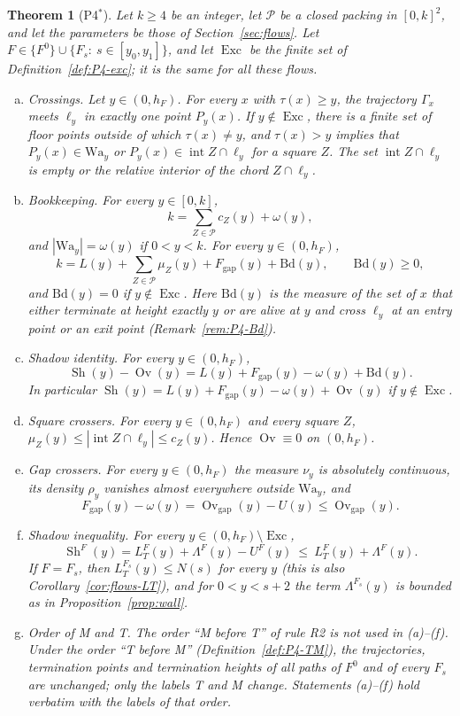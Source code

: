 \documentclass[11pt]{amsart}
\newcommand{\cP}{\mathcal P}
\newcommand{\Sh}{\operatorname{Sh}}
\newcommand{\Ov}{\operatorname{Ov}}
\newcommand{\Ovgap}{\operatorname{Ov}_{\mathrm{gap}}}
\newcommand{\Fgap}{F_{\mathrm{gap}}}
\newcommand{\Exc}{\operatorname{Exc}}
\newcommand{\Lam}{\Lambda}
\newcommand{\Fz}{F^{0}}
\newcommand{\Fs}{F_{s}}
\newtheorem{theorem}{Theorem}[section]
\theoremstyle{definition}
\theoremstyle{remark}
\numberwithin{equation}{section}
\begin{document}
\begin{theorem}[P4$^*$]\label{thm:P4}
Let $k\ge4$ be an integer, let $\cP$ be a closed packing in $[0,k]^2$, and let the parameters be those of Section~\ref{sec:flows}. Let $F\in\{\Fz\}\cup\{\Fs:\ s\in[y_0,y_1]\}$, and let $\Exc$ be the finite set of Definition~\ref{def:P4-exc}; it is the same for all these flows.
\begin{enumerate}[(a)]
\item \emph{Crossings.} Let $y\in(0,h_F)$. For every $x$ with $\tau(x)\ge y$, the trajectory $\Gamma_x$ meets $\ell_y$ in exactly one point $P_y(x)$. If $y\notin\Exc$, there is a finite set of floor points outside of which $\tau(x)\ne y$, and $\tau(x)>y$ implies that $P_y(x)\in\mathrm{Wa}_y$ or $P_y(x)\in\operatorname{int}Z\cap\ell_y$ for a square $Z$. The set $\operatorname{int}Z\cap\ell_y$ is empty or the relative interior of the chord $Z\cap\ell_y$.
\item \emph{Bookkeeping.} For every $y\in[0,k]$,
\[
k=\sum_{Z\in\cP}c_Z(y)+\omega(y),
\]
and $|\mathrm{Wa}_y|=\omega(y)$ if $0<y<k$. For every $y\in(0,h_F)$,
\[
k=L(y)+\sum_{Z\in\cP}\mu_Z(y)+\Fgap(y)+\mathrm{Bd}(y),\qquad \mathrm{Bd}(y)\ge0,
\]
and $\mathrm{Bd}(y)=0$ if $y\notin\Exc$. Here $\mathrm{Bd}(y)$ is the measure of the set of $x$ that either terminate at height exactly $y$ or are alive at $y$ and cross $\ell_y$ at an entry point or an exit point (Remark~\ref{rem:P4-Bd}).
\item \emph{Shadow identity.} For every $y\in(0,h_F)$,
\[
\Sh(y)-\Ov(y)=L(y)+\Fgap(y)-\omega(y)+\mathrm{Bd}(y).
\]
In particular $\Sh(y)=L(y)+\Fgap(y)-\omega(y)+\Ov(y)$ if $y\notin\Exc$.
\item \emph{Square crossers.} For every $y\in(0,h_F)$ and every square $Z$, $\mu_Z(y)\le|\operatorname{int}Z\cap\ell_y|\le c_Z(y)$. Hence $\Ov\equiv0$ on $(0,h_F)$.
\item \emph{Gap crossers.} For every $y\in(0,h_F)$ the measure $\nu_y$ is absolutely continuous, its density $\rho_y$ vanishes almost everywhere outside $\mathrm{Wa}_y$, and
\[
\Fgap(y)-\omega(y)=\Ovgap(y)-U(y)\le\Ovgap(y).
\]
\item \emph{Shadow inequality.} For every $y\in(0,h_F)\setminus\Exc$,
\[
\Sh^F(y)=L^F_T(y)+\Lam^F(y)-U^F(y)\ \le\ L^F_T(y)+\Lam^F(y).
\]
If $F=\Fs$, then $L^{\Fs}_T(y)\le N(s)$ for every $y$ (this is also Corollary~\ref{cor:flows-LT}), and for $0<y<s+2$ the term $\Lam^{\Fs}(y)$ is bounded as in Proposition~\ref{prop:wall}.
\item \emph{Order of M and T.} The order ``M before T'' of rule R2 is not used in (a)--(f). Under the order ``T before M'' (Definition~\ref{def:P4-TM}), the trajectories, termination points and termination heights of all paths of $\Fz$ and of every $\Fs$ are unchanged; only the labels T and M change. Statements (a)--(f) hold verbatim with the labels of that order.
\end{enumerate}
\end{theorem}
\end{document}
